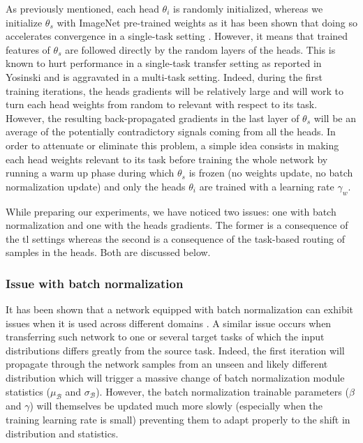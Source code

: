 As previously mentioned, each head $\theta_i$ is randomly initialized, whereas we initialize $\theta_s$ with ImageNet pre-trained weights as it has been shown that doing so accelerates convergence in a single-task setting \cite{mormont2018comparison}. However, it means that trained features of $\theta_s$ are followed directly by the random layers of the heads. This is known to hurt performance in a single-task transfer setting as reported in Yosinski \etal \cite{yosinski2014transferable} and is aggravated in a multi-task setting. Indeed, during the first training iterations, the heads gradients will be relatively large and will work to turn each head weights from random to relevant with respect to its task. However, the resulting back-propagated gradients in the last layer of $\theta_s$ will be an average of the potentially contradictory signals coming from all the heads. In order to attenuate or eliminate this problem, a simple idea consists in making each head weights relevant to its task before training the whole network by running a warm up phase during which $\theta_s$ is frozen (\ie no weights update, no batch normalization update) and only the heads $\theta_i$ are trained with a learning rate $\gamma_w$. 

While preparing our experiments, we have noticed two issues: one with batch normalization \cite{ioffe2015batch} and one with the heads gradients. The former is a consequence of the \acrlong{tl} settings whereas the second is a consequence of the task-based routing of samples in the heads. Both are discussed below.

\subsubsection{Issue with batch normalization} 
\label{sssec:mtask:batchnormissue}

It has been shown that a network equipped with batch normalization \cite{ioffe2015batch} can exhibit issues when it is used across different domains \cite{li2018adaptive, chang2019domain}. A similar issue occurs when transferring such network to one or several target tasks of which the input distributions differs greatly from the source task. Indeed, the first iteration will propagate through the network samples from an unseen and likely different distribution which will trigger a massive change of batch normalization module statistics ($\mu_\mathcal{B}$ and $\sigma_\mathcal{B}$). However, the batch normalization trainable parameters ($\beta$ and $\gamma$) will themselves be updated much more slowly (especially when the training learning rate is small) preventing them to adapt properly to the shift in distribution and statistics. 

